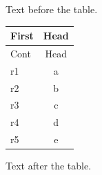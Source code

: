 \documentclass[12pt]{article}
\begin{document}
Text before the table.

\begin{longtable}{lc}
\hline First & Head\\\hline
\endfirsthead
\hline Cont & Head\\\hline
\endhead
\hline
\endfoot
\hline\hline
\endlastfoot
r1 & a\\
r2 & b\\
r3 & c\\
\newpage
r4 & d\\
r5 & e\\
\end{longtable}

Text after the table.
\end{document}
